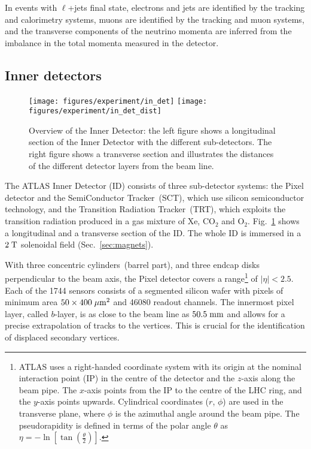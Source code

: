 In \ttbar{} events with $\ell{}$+jets final state, electrons
and jets are identified by the tracking and calorimetry systems, muons
are identified by the tracking and muon systems, and the transverse
components of the neutrino momenta are inferred from the imbalance in
the total momenta measured in the detector.

\subsection{Inner detectors}
\label{sec:ID}

\begin{figure}[ht]
\centering
\texttt{[image: figures/experiment/in\_det]}
\texttt{[image: figures/experiment/in\_det\_dist]}
\caption[Overview of the Inner Detector]{
  Overview of the Inner Detector: 
  the left figure shows a longitudinal section of the Inner Detector
  with the different sub-detectors.
  The right figure shows a transverse section and illustrates the
  distances of the different detector layers from the beam line.}
\label{fig:ID}
\end{figure}

The ATLAS Inner Detector (ID) consists of three sub-detector systems:
the Pixel detector and the SemiConductor Tracker~(SCT), which use silicon semiconductor
technology, and the Transition Radiation Tracker~(TRT), 
which exploits the transition radiation produced in a gas mixture of Xe, CO$_2$ and O$_2$.
Fig.~\ref{fig:ID} shows a longitudinal and a transverse section of the ID.
The whole ID is immersed in a \mbox{$2 \; \mathrm{T}$} solenoidal field (Sec.~\ref{sec:magnets}).

With three concentric cylinders~(barrel part), and three endcap disks
perpendicular to the beam axis, the Pixel detector covers a
range\footnote{ATLAS uses a right-handed coordinate system
  with its origin at the nominal interaction point (IP) in the centre
  of the detector and the $z$-axis along the beam pipe. 
  The $x$-axis points from the IP to the centre of the LHC ring, and the $y$-axis points
  upwards. Cylindrical coordinates ($r$, $\phi$) are used in the
  transverse plane, where $\phi$ is the azimuthal angle around the beam pipe. The
  pseudorapidity is defined in terms of the polar angle $\theta$ as 
  \mbox{$\eta = - \ln \left[ \tan \left( \frac{\theta}{2} \right)
    \right]$}.} of \mbox{$|\eta| < 2.5$}.
Each of the 1744 sensors consists of a segmented silicon wafer with
pixels of minimum area \mbox{$50 \times 400 \; \mu\mathrm{m}^2$} and 46080 readout channels.
The innermost pixel layer, called $b$-layer, is as close to the beam
line as \mbox{$50.5 \; \mathrm{mm}$} and allows for a precise extrapolation of tracks
to the vertices.
This is crucial for the identification of displaced secondary vertices.

